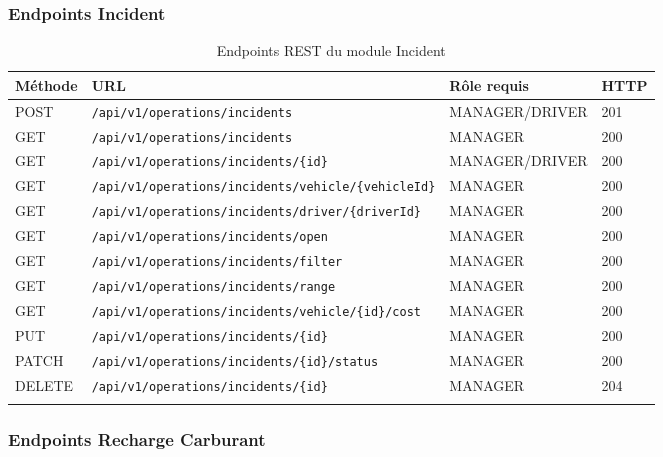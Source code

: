 \documentclass[12pt,a4paper]{report}
\begin{document}
\subsubsection{Endpoints Incident}

\begin{longtable}{p{1.5cm}p{6.5cm}p{2.5cm}p{2cm}}
\toprule
\textbf{Méthode} & \textbf{URL} & \textbf{Rôle requis} & \textbf{HTTP} \\
\midrule
\endhead
POST & \texttt{/api/v1/operations/incidents} & MANAGER/DRIVER & 201 \\
GET & \texttt{/api/v1/operations/incidents} & MANAGER & 200 \\
GET & \texttt{/api/v1/operations/incidents/\{id\}} & MANAGER/DRIVER & 200 \\
GET & \texttt{/api/v1/operations/incidents/vehicle/\{vehicleId\}} & MANAGER & 200 \\
GET & \texttt{/api/v1/operations/incidents/driver/\{driverId\}} & MANAGER & 200 \\
GET & \texttt{/api/v1/operations/incidents/open} & MANAGER & 200 \\
GET & \texttt{/api/v1/operations/incidents/filter} & MANAGER & 200 \\
GET & \texttt{/api/v1/operations/incidents/range} & MANAGER & 200 \\
GET & \texttt{/api/v1/operations/incidents/vehicle/\{id\}/cost} & MANAGER & 200 \\
PUT & \texttt{/api/v1/operations/incidents/\{id\}} & MANAGER & 200 \\
PATCH & \texttt{/api/v1/operations/incidents/\{id\}/status} & MANAGER & 200 \\
DELETE & \texttt{/api/v1/operations/incidents/\{id\}} & MANAGER & 204 \\
\bottomrule
\caption{Endpoints REST du module Incident}
\end{longtable}

\subsubsection{Endpoints Recharge Carburant}
\end{document}
